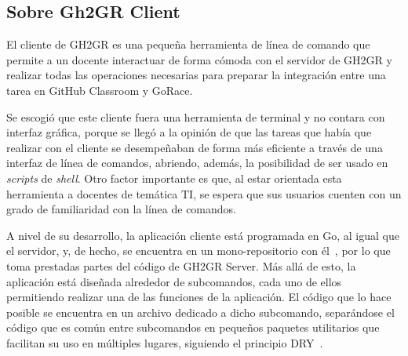 \subsection{Sobre Gh2GR Client}
El cliente de GH2GR es una pequeña herramienta de línea de comando que permite a un docente interactuar de forma cómoda con el servidor de GH2GR y realizar todas las operaciones necesarias para preparar la integración entre una tarea en GitHub Classroom y GoRace.

Se escogió que este cliente fuera una herramienta de terminal y no contara con interfaz gráfica, porque se llegó a la opinión de que las tareas que había que realizar con el cliente se desempeñaban de forma más eficiente a través de una interfaz de línea de comandos, abriendo, además, la posibilidad de ser usado en \textit{scripts} de \textit{shell}. Otro factor importante es que, al estar orientada esta herramienta a docentes de temática \acrshort{TI}, se espera que sus usuarios cuenten con un grado de familiaridad con la línea de comandos.

A nivel de su desarrollo, la aplicación cliente está programada en Go, al igual que el servidor, y, de hecho, se encuentra en un mono-repositorio con él~\cite{githubGitHubClaudio4GH2GR}, por lo que toma prestadas partes del código de GH2GR Server. Más allá de esto, la aplicación está diseñada alrededor de subcomandos, cada uno de ellos permitiendo realizar una de las funciones de la aplicación. El código que lo hace posible se encuentra en un archivo dedicado a dicho subcomando, separándose el código que es común entre subcomandos en pequeños paquetes utilitarios que facilitan su uso en múltiples lugares, siguiendo el principio \acrshort{DRY}~\cite{Hunt1999-sb}.

